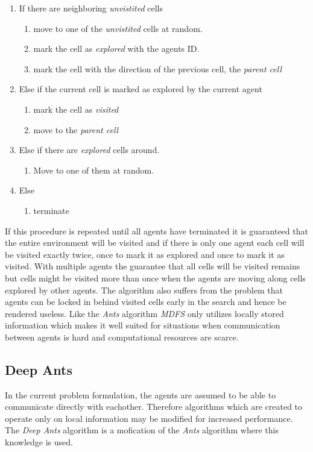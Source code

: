 \documentclass{article}
\begin{document}
\begin{enumerate}
\item If there are neighboring \textit{unvistited} cells
  \begin{enumerate}
  \item move to one of the \textit{unvistited} cells at random.
  \item mark the cell as \textit{explored} with the agents ID.
  \item mark the cell with the direction of the previous cell, the \textit{parent cell} 
  \end{enumerate}
\item Else if the current cell is marked as explored by the current agent
  \begin{enumerate}
  \item mark the cell as \textit{visited}
  \item move to the \textit{parent cell}
  \end{enumerate}
\item Else if there are \textit{explored} cells around.
  \begin{enumerate}
  \item Move to one of them at random.
  \end{enumerate}
\item Else
  \begin{enumerate}
  \item terminate
  \end{enumerate}
\end{enumerate}

If this procedure is repeated until all agents have terminated it is guaranteed
that the entire environment will be visited and if there is only one agent each
cell will be visited exactly twice, once to mark it as explored and once to
mark it as visited. With multiple agents the guarantee that all cells will be
visited remains but cells might be visited more than once when the agents are
moving along cells explored by other agents. The algorithm also suffers from the
problem that agents can be locked in behind visited cells early in the search
and hence be rendered useless. Like the \textit{Ants} algorithm \textit{MDFS}
only utilizes locally stored information which makes it well suited for
situations when communication between agents is hard and computational resources
are scarce.
\subsection{Deep Ants}
In the current problem formulation, the agents are assumed to be able to
communicate directly with eachother. Therefore algorithms which are created to
operate only on local information may be modified for increased performance. The
\textit{Deep Ants} algorithm is a mofication of the \textit{Ants} algorithm
where this knowledge is used.
\end{document}
